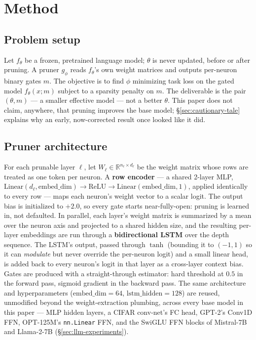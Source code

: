 \documentclass[11pt]{article}
\begin{document}
\section{Method}
\label{sec:method}

\subsection{Problem setup}
\label{sec:problem-setup}

Let $f_\theta$ be a frozen, pretrained language model; $\theta$ is never
updated, before or after pruning. A pruner $g_\phi$ reads $f_\theta$'s own
weight matrices and outputs per-neuron binary gates $m$. The objective is to
find $\phi$ minimizing task loss on the gated model $f_\theta(x; m)$ subject
to a sparsity penalty on $m$. The deliverable is the pair $(\theta, m)$ --- a
smaller effective model --- not a better $\theta$. This paper does not claim,
anywhere, that pruning improves the base model; \S\ref{sec:cautionary-tale} explains why an early,
now-corrected result once looked like it did.

\subsection{Pruner architecture}
\label{sec:architecture}

For each prunable layer $\ell$, let $W_\ell \in \mathbb{R}^{n_\ell \times
d_\ell}$ be the weight matrix whose rows are treated as one token per neuron.
A \textbf{row encoder} --- a shared 2-layer MLP, $\mathrm{Linear}(d_\ell,
\mathrm{embed\_dim}) \to \mathrm{ReLU} \to \mathrm{Linear}(\mathrm{embed\_dim},
1)$, applied identically to every row --- maps each neuron's weight vector to a
scalar logit. The output bias is initialized to $+2.0$, so every gate starts
near-fully-open: pruning is learned in, not defaulted. In parallel, each
layer's weight matrix is summarized by a mean over the neuron axis and
projected to a shared hidden size, and the resulting per-layer embeddings are
run through a \textbf{bidirectional LSTM} over the depth sequence. The LSTM's
output, passed through $\tanh$ (bounding it to $(-1,1)$ so it can \emph{modulate}
but never override the per-neuron logit) and a small linear head, is added
back to every neuron's logit in that layer as a cross-layer context bias.
Gates are produced with a straight-through estimator: hard threshold at $0.5$
in the forward pass, sigmoid gradient in the backward pass. The same
architecture and hyperparameters ($\mathrm{embed\_dim}=64$,
$\mathrm{lstm\_hidden}=128$) are reused, unmodified beyond the
weight-extraction plumbing, across every base model in this paper --- MLP
hidden layers, a CIFAR conv-net's FC head, GPT-2's Conv1D FFN, OPT-125M's
\texttt{nn.Linear} FFN, and the SwiGLU FFN blocks of Mistral-7B and Llama-2-7B (\S\ref{sec:llm-experiments}).
\end{document}
